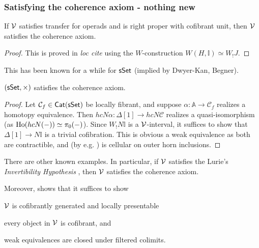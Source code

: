 \documentclass[a4paper,10pt
,draft
]{article}%
\newcommand{\I}{\mathbb I}
\renewcommand{\1}{\ensuremath{\mathbb{id}}}
\begin{document}
\subsubsection{Satisfying the coherence axiom - nothing new}
\begin{lemma}
      [{\cite[Prop 2.24]{BM13}}]
      If $\mathcal V$ satisfies transfer for operads and
      is right proper with cofibrant unit,
      then $\mathcal V$ satisfies the coherence axiom.
\end{lemma}
\begin{proof}
      This is proved in \textit{loc cite} using the $W$-construction $W(H,\I) \simeq W_!J$.
\end{proof}

This has been known for a while for $\mathsf{sSet}$ (implied by Dwyer-Kan, Begner).

\begin{proposition}
      $(\mathsf{sSet}, \times)$       %
      satisfies the coherence axiom.
\end{proposition}
\begin{proof}
      Let $\mathcal C_f \in \mathsf{Cat}(\mathsf{sSet})$ be locally fibrant, and
      suppose $\alpha: \mathbb A \to \mathcal C_f$ realizes a homotopy equivalence.
      Then $h c N \alpha: \Delta[1] \to h c N \mathcal C$ realizes a quasi-isomorphism (as $\operatorname{Ho}(h c N (-)) \simeq \pi_0(-)$).
      Since $W_!N \I$ is a $\mathcal V$-interval,
      it suffices to show that $\Delta[1] \to N \I$ is a trivial cofibration.
      This is obvious a weak equivalence as both are contractible,
      and (by e.g. \cite[Lemma 0.15]{Rie}) is cellular on outer horn inclusions.
\end{proof}

\begin{remark}
      There are other known examples.
      In particular,   
      if $\mathcal V$ satisfies the Lurie's \textit{Invertibility Hypothesis} \cite[A.3.2.12]{Lur09},
      then $\mathcal V$ satisfies the coherence axiom.

      Moreover, \cite{Law16} shows that it suffices to show
      \begin{enumerate*}
      \item $\mathcal V$ is cofibrantly generated and locally presentable
      \item every object in $\mathcal V$ is cofibrant, and
      \item weak equivalences are closed under filtered colimits.
      \end{enumerate*}
\end{remark}
\end{document}
